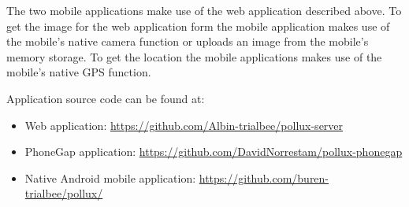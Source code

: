 The two mobile applications make use of the web application described above. To get the image for the web application form the mobile application makes use of the mobile's native camera function or uploads an image from the mobile's memory storage. To get the location the mobile applications makes use of the mobile's native GPS function. 

Application source code can be found at:
\begin{itemize}
  \item Web application: \url{https://github.com/Albin-trialbee/pollux-server}
  \item PhoneGap application: \url{https://github.com/DavidNorrestam/pollux-phonegap}
  \item Native Android mobile application: \url{https://github.com/buren-trialbee/pollux/}
\end{itemize}